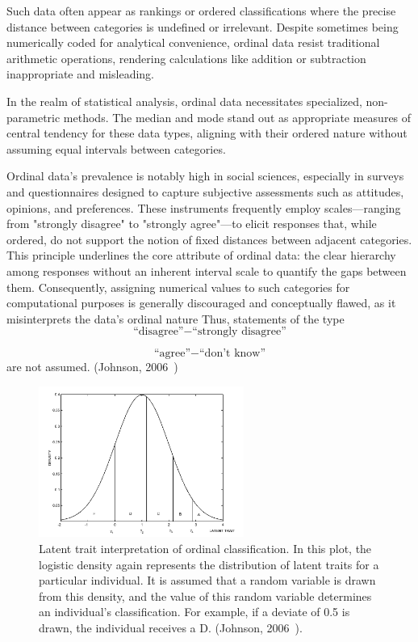 \documentclass{article}
\begin{document}
Such data often appear as rankings or ordered classifications where the precise distance between categories is undefined or irrelevant. Despite sometimes being numerically coded for analytical convenience, ordinal data resist traditional arithmetic operations, rendering calculations like addition or subtraction inappropriate and misleading.

In the realm of statistical analysis, ordinal data necessitates specialized, non-parametric methods. The median and mode stand out as appropriate measures of central tendency for these data types, aligning with their ordered nature without assuming equal intervals between categories.

Ordinal data's prevalence is notably high in social sciences, especially in surveys and questionnaires designed to capture subjective assessments such as attitudes, opinions, and preferences. These instruments frequently employ scales—ranging from "strongly disagree" to "strongly agree"—to elicit responses that, while ordered, do not support the notion of fixed distances between adjacent categories. This principle underlines the core attribute of ordinal data: the clear hierarchy among responses without an inherent interval scale to quantify the gaps between them. Consequently, assigning numerical values to such categories for computational purposes is generally discouraged and conceptually flawed, as it misinterprets the data's ordinal nature 
Thus, statements of the type
\[
\text{``disagree''} - \text{``strongly disagree''}
\]

\[
\text{``agree''} - \text{``don't know''}
\]
are not assumed. (Johnson, 2006~\cite{Johnson1999})

\begin{figure}[ht!] %
    \centering %
    \includegraphics[width=0.6\textwidth]{images/ordinal_data_dist.png} %
    \caption{Latent trait interpretation of ordinal classification. 
    In this plot, the logistic density again represents the distribution of latent traits for a particular individual. 
    It is assumed that a random variable is drawn from this density, and the value of this random variable determines an individual's classification. 
    For example, if a deviate of 0.5 is drawn, the individual receives a D. (Johnson, 2006~\cite{Johnson1999}).} %
    \label{fig:ordinal} %
  \end{figure}
\end{document}
